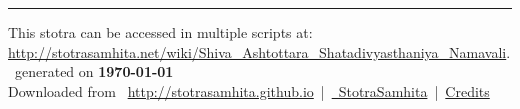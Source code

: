 \documentclass[a5paper,twoside,12pt]{book}
\begin{document}
\setmainfont[Script=Devanagari,Mapping=tex-text]{Sanskrit 2003}
\fontsize {16}{19.25}\selectfont
\let\head\chapt
\begin{center}

\end{center}
\vfill
\centering
\rule{0.8\textwidth}{0.6pt}

\footnotesize
{}\sffamily
This stotra can be accessed in multiple scripts at:\\
\url{http://stotrasamhita.net/wiki/Shiva_Ashtottara_Shatadivyasthaniya_Namavali}.\\[1ex]
\faFilePdfO~generated on \textbf{\today}\\[1ex]
Downloaded from \faGlobe{}~\url{http://stotrasamhita.github.io}~|~\href{https://github.com/StotraSamhita}{\faGithubSquare{}~StotraSamhita}~|~\href{https://stotrasamhita.github.io/about/}{Credits}
\end{document}

